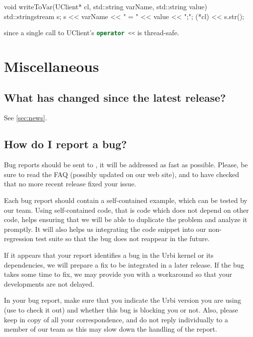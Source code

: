 \begin{cxx}
void
writeToVar(UClient* cl, std::string varName, std::string value)
{
  std::stringstream s;
  s << varName << " = " << value << ";";
  (*cl) << s.str();
}
\end{cxx}

\noindent
since a single call to UClient's \lstinline[language=C++]|operator <<|
is thread-safe.


\section{Miscellaneous}
\subsection{What has changed since the latest release?}
See \autoref{sec:news}.

\subsection{How do I report a bug?}

Bug reports should be sent to , it
will be addressed as fast as possible.  Please, be sure to read the
FAQ (possibly updated on our web site), and to have checked that no
more recent release fixed your issue.

Each bug report should contain a self-contained example, which can be
tested by our team. Using self-contained code, that is code which does
not depend on other code, helps ensuring that we will be able to
duplicate the problem and analyze it promptly. It will also helps us
integrating the code snippet into our non-regression test suite so
that the bug does not reappear in the future.

If it appears that your report identifies a bug in the Urbi kernel or
its dependencies, we will prepare a fix to be integrated in a later
release. If the bug takes some time to fix, we may provide you with a
workaround so that your developments are not delayed.

In your bug report, make sure that you indicate the Urbi version you
are using (use  to check it out) and whether this
bug is blocking you or not. Also, please keep
 in copy of all your
correspondence, and do not reply individually to a member of our team
as this may slow down the handling of the report.


\ifx\ifHtml\undefined\else
  \let\subsubsection\subsubsectionSave
\fi


